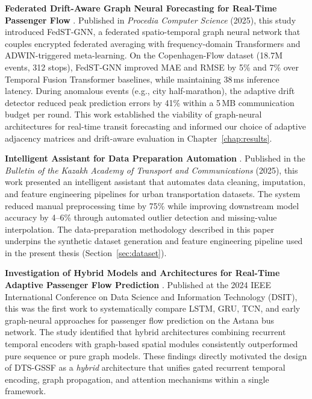 \textbf{Federated Drift-Aware Graph Neural Forecasting for Real-Time Passenger Flow} \cite{sakhipov2025federated}. Published in \textit{Procedia Computer Science} (2025), this study introduced FedST-GNN, a federated spatio-temporal graph neural network that couples encrypted federated averaging with frequency-domain Transformers and ADWIN-triggered meta-learning. On the Copenhagen-Flow dataset (18.7M events, 312 stops), FedST-GNN improved MAE and RMSE by 5\% and 7\% over Temporal Fusion Transformer baselines, while maintaining 38\,ms inference latency. During anomalous events (e.g., city half-marathon), the adaptive drift detector reduced peak prediction errors by 41\% within a 5\,MB communication budget per round. This work established the viability of graph-neural architectures for real-time transit forecasting and informed our choice of adaptive adjacency matrices and drift-aware evaluation in Chapter~\ref{chap:results}.

\textbf{Intelligent Assistant for Data Preparation Automation} \cite{yedilkhan2025intelligent}. Published in the \textit{Bulletin of the Kazakh Academy of Transport and Communications} (2025), this work presented an intelligent assistant that automates data cleaning, imputation, and feature engineering pipelines for urban transportation datasets. The system reduced manual preprocessing time by 75\% while improving downstream model accuracy by 4--6\% through automated outlier detection and missing-value interpolation. The data-preparation methodology described in this paper underpins the synthetic dataset generation and feature engineering pipeline used in the present thesis (Section~\ref{sec:dataset}).

\textbf{Investigation of Hybrid Models and Architectures for Real-Time Adaptive Passenger Flow Prediction} \cite{begisbayev2024investigation}. Published at the 2024 IEEE International Conference on Data Science and Information Technology (DSIT), this was the first work to systematically compare LSTM, GRU, TCN, and early graph-neural approaches for passenger flow prediction on the Astana bus network. The study identified that hybrid architectures combining recurrent temporal encoders with graph-based spatial modules consistently outperformed pure sequence or pure graph models. These findings directly motivated the design of DTS-GSSF as a \textit{hybrid} architecture that unifies gated recurrent temporal encoding, graph propagation, and attention mechanisms within a single framework.